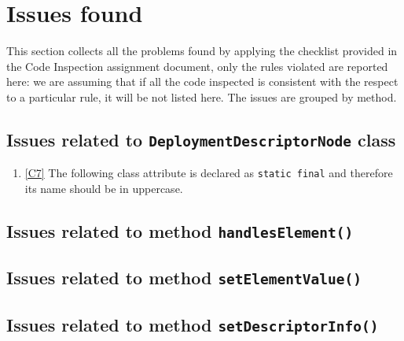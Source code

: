 \newpage
\section{Issues found}
\label{sec:issues}
This section collects all the problems found by applying the checklist provided in the Code Inspection assignment document, only the rules violated are reported here: we are assuming that if all the code inspected is consistent with the respect to a particular rule, it will be not listed here.
The issues are grouped by method.
\subsection{Issues related to \texttt{DeploymentDescriptorNode} class}
\begin{enumerate}
	\item \ref{C7} The following class attribute is declared as \texttt{static final} and therefore its name should be in uppercase. 
\end{enumerate}

\subsection{Issues related to method \texttt{handlesElement()}}

\subsection{Issues related to method \texttt{setElementValue()}}

\subsection{Issues related to method \texttt{setDescriptorInfo()}}